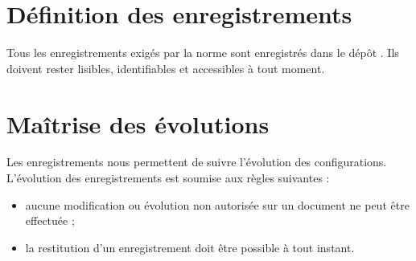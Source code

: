 
\section{Définition des enregistrements}

Tous les enregistrements exigés par la norme \isoNeufMilleUn{} sont enregistrés dans le dépôt \git. Ils doivent rester lisibles, identifiables et accessibles à tout moment.

\section{Maîtrise des évolutions}

Les enregistrements nous permettent de suivre l’évolution des configurations. L’évolution des enregistrements est soumise aux règles suivantes :
\begin{itemize}
\item aucune modification ou évolution non autorisée sur un document ne peut être effectuée ;
\item la restitution d’un enregistrement doit être possible à tout instant.
\end{itemize}


